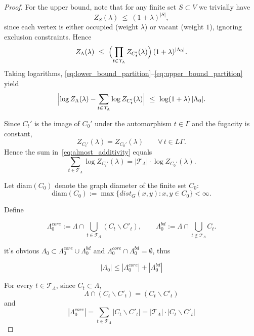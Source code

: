 \documentclass[a4paper,11pt]{article}
\theoremstyle{plain}
\theoremstyle{definition}
\theoremstyle{remark}
\newcommand{\1}{\mathbf{1}}
\begin{document}
\begin{proof}
For the upper bound, note that for any finite set $S\subset V$ we trivially have
\begin{equation}\label{eq:trivial_upper_bound}
Z_S(\lambda)\ \le\ (1+\lambda)^{|S|},
\end{equation}
since each vertex is either occupied (weight $\lambda$) or vacant (weight $1$), ignoring exclusion
constraints. Hence
\begin{equation}\label{eq:upper_bound_partition}
Z_\Lambda(\lambda)
\ \le\
\Bigl(\prod_{t\in\mathcal{T}_\Lambda} Z_{C_t'}(\lambda)\Bigr)\,(1+\lambda)^{|\Lambda_0|}.
\end{equation}
Taking logarithms, \eqref{eq:lower_bound_partition}--\eqref{eq:upper_bound_partition} yield
\begin{equation}\label{eq:almost_additivity}
\Bigl|\log Z_\Lambda(\lambda)-\sum_{t\in\mathcal{T}_\Lambda}\log Z_{C_t'}(\lambda)\Bigr|
\ \le\ \log(1+\lambda)\,|\Lambda_0|.
\end{equation}

Since $C_t'$ is the image of $C_0'$ under the automorphism $t\in\Gamma$ and the fugacity is constant,
\[
Z_{C_t'}(\lambda)=Z_{C_0'}(\lambda)\qquad \forall\,t\in L\Gamma.
\]
Hence the sum in~\eqref{eq:almost_additivity} equals
\[
\sum_{t\in\mathcal{T}_\Lambda}\log Z_{C_t'}(\lambda)
=|\mathcal{T}_\Lambda|\cdot \log Z_{C_0'}(\lambda).
\]

Let $\mathrm{diam}(C_0)$ denote the graph diameter of the finite set $C_0$:
\[
\mathrm{diam}(C_0):=\max\{dist_G(x,y):x,y\in C_0\}<\infty.
\]

Define 

\begin{equation}
    \Lambda^{core}_0:=\Lambda\cap\bigcup_{t\in\mathcal{T}_\Lambda}(C_t\backslash C'_t), \qquad \Lambda^{bd}_0:=\Lambda\cap\bigcup_{t\notin\mathcal{T}_\Lambda}C_t.
\end{equation}

it's obvious $\Lambda_0\subset\Lambda_0^{core}\cup\Lambda_0^{bd}$ and $\Lambda_0^{core}\cap\Lambda_0^{bd}=\emptyset$, thus

\begin{equation}
    |\Lambda_0|\le|\Lambda_0^{core}|+|\Lambda_0^{bd}|
\end{equation}

For every $t\in\mathcal{T}_\Lambda$, since $C_t\subset\Lambda$,
\begin{equation}
    \Lambda\cap(C_t\backslash C'_t)=(C_t\backslash C'_t)
\end{equation}
and
\begin{equation}
    |\Lambda_0^{core}|=\sum_{t\in\mathcal{T}_\Lambda}|C_t\backslash C'_t|=|\mathcal{T}_\Lambda|\cdot |C_t\backslash C'_t|
\end{equation}


\end{proof}
\end{document}
